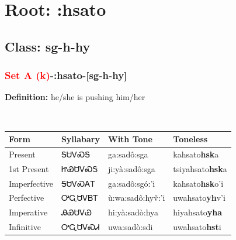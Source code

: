 \needspace{4in}
\section*{Root: :hsato}
\nopagebreak
{}
\needspace{3in}
\subsection*{Class: sg-h-hy}
\nopagebreak
\needspace{2in}
\subsubsection*{\textcolor{Red}{Set A (k)}{-}\textbf{:hsato}{-}[sg-h-hy]}
\nopagebreak
\textbf{Definition: } he/she is pushing him/her
\\[0.5em]
\begin{tabularx}{\textwidth}{l X X X}%
\toprule%
\textbf{Form}&\textbf{Syllabary}&\textbf{With Tone}&\textbf{Toneless}\\%
\midrule%
Present&ᎦᏌᏙᏍᎦ&ga:sadô:sga&kahsato\textbf{hsk}a\\%
1st Present&ᏥᏯᏌᏙᏍᎦ&ji:yà:sadô:sga&tsiyahsato\textbf{hsk}a\\%
Imperfective&ᎦᏌᏙᏍᎪᎢ&ga:sadô:sgó:’i&kahsato\textbf{hsk}o'i\\%
Perfective&ᎤᏩᏌᏙᏴᎢ&ù:wa:sadô:hyv̌:’i&uwahsato\textbf{yh}v'i\\%
Imperative&ᎯᏯᏌᏙᏯ&hi:yà:sadò:hya&hiyahsato\textbf{yha}\\%
Infinitive&ᎤᏩᏌᏙᏍᏗ&uwa:sadò:sdi&uwahsato\textbf{hst}i\\%
\bottomrule%
\end{tabularx}
\\[1em]